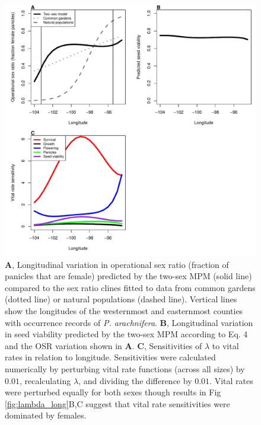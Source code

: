 \documentclass[11pt]{article}
\begin{document}
\newpage
\begin{figure}[H]
	\begin{center}
		\includegraphics[width=\linewidth]{Figures/SR_viab_sens}
		\caption{\textbf{A}, Longitudinal variation in operational sex ratio (fraction of panicles that are female) predicted by the two-sex MPM (solid line) compared to the sex ratio clines fitted to data from common gardens (dotted line) or natural populations (dashed line).
			Vertical lines show the longitudes of the westernmost and easternmost counties with occurrence records of \textit{P. arachnifera}.
			\textbf{B}, Longitudinal variation in seed viability predicted by the two-sex MPM according to Eq. 4 and the OSR variation shown in \textbf{A}.
			\textbf{C}, Sensitivities of $\lambda$ to vital rates in relation to longitude.
			Sensitivities were calculated numerically by perturbing vital rate functions (across all sizes) by $0.01$, recalculating $\lambda$, and dividing the difference by $0.01$.
			Vital rates were perturbed equally for both sexes though results in Fig \ref{fig:lambda_long}B,C suggest that vital rate sensitivities were dominated by females. 
		}
		\label{fig:SR_viab_sens}
	\end{center}
\end{figure}
\end{document}
